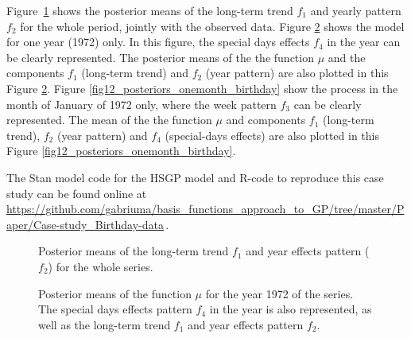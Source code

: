 Figure~\ref{fig10_posteriors_birthday} shows the posterior means of the long-term trend $f_1$ and yearly pattern $f_2$ for the whole period, jointly with the observed data. Figure \ref{fig11_posteriors_oneyear_birthday} shows the model for one year (1972) only. In this figure, the special days effects $f_4$ in the year can be clearly represented. The posterior means of the the function $\mu$ and the components $f_1$ (long-term trend) and $f_2$ (year pattern) are also plotted in this Figure \ref{fig11_posteriors_oneyear_birthday}. Figure \ref{fig12_posteriors_onemonth_birthday} show the process in the month of January of 1972 only, where the week pattern $f_3$ can be clearly represented. The mean of the the function $\mu$ and components $f_1$ (long-term trend), $f_2$ (year pattern) and $f_4$ (special-days effects) are also plotted in this Figure \ref{fig12_posteriors_onemonth_birthday}. 

The Stan model code for the HSGP model and R-code to reproduce this case study can be found online at {\small \url{https://github.com/gabriuma/basis_functions_approach_to_GP/tree/master/Paper/Case-study_Birthday-data}}\,.

\begin{figure}
\centering
{}
\caption{Posterior means of the long-term trend $f_1$ and year effects pattern ($f_2$) for the whole series. }
  \label{fig10_posteriors_birthday}
\end{figure}

\begin{figure}%
\centering
{}
\caption{Posterior means of the function $\mu$ for the year 1972 of the series. The special days effects pattern $f_4$ in the year is also represented, as well as the long-term trend $f_1$ and year effects pattern $f_2$. }
  \label{fig11_posteriors_oneyear_birthday}
\end{figure}

